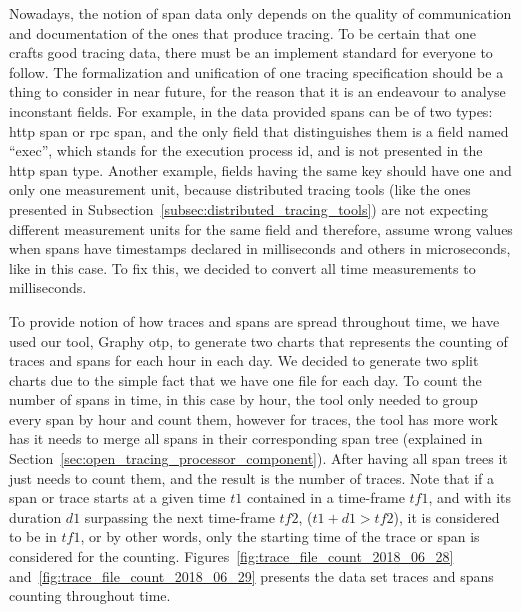 Nowadays, the notion of span data only depends on the quality of communication and documentation of the ones that produce tracing. To be certain that one crafts good tracing data, there must be an implement standard for everyone to follow. The formalization and unification of one tracing specification should be a thing to consider in near future, for the reason that it is an endeavour to analyse inconstant fields. For example, in the data provided spans can be of two types: \gls{http} span or \gls{rpc} span, and the only field that distinguishes them is a field named ``exec'', which stands for the execution process id, and is not presented in the \gls{http} span type. Another example, fields having the same key should have one and only one measurement unit, because distributed tracing tools (like the ones presented in Subsection~\ref{subsec:distributed_tracing_tools}) are not expecting different measurement units for the same field and therefore, assume wrong values when spans have timestamps declared in milliseconds and others in microseconds, like in this case. To fix this, we decided to convert all time measurements to milliseconds.

To provide notion of how traces and spans are spread throughout time, we have used our tool, Graphy \gls{otp}, to generate two charts that represents the counting of traces and spans for each hour in each day. We decided to generate two split charts due to the simple fact that we have one file for each day. To count the number of spans in time, in this case by hour, the tool only needed to group every span by hour and count them, however for traces, the tool has more work has it needs to merge all spans in their corresponding span tree (explained in Section~\ref{sec:open_tracing_processor_component}). After having all span trees it just needs to count them, and the result is the number of traces. Note that if a span or trace starts at a given time $t1$ contained in a time-frame $tf1$, and with its duration $d1$ surpassing the next time-frame $tf2$, ($t1 + d1 > tf2$), it is considered to be in $tf1$, or by other words, only the starting time of the trace or span is considered for the counting. Figures~\ref{fig:trace_file_count_2018_06_28} and~\ref{fig:trace_file_count_2018_06_29} presents the data set traces and spans counting throughout time.

